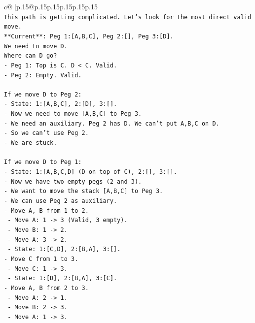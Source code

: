 \documentclass{article}
\begin{document}
{\begin{supertabular}{c@{$\;$}|p{.15\linewidth}@{}p{.15\linewidth}p{.15\linewidth}p{.15\linewidth}p{.15\linewidth}p{.15\linewidth}}
{{{\\ 
\texttt{This path is getting complicated. Let's look for the most direct valid move.} \\
\texttt{**Current**: Peg 1:{[}A,B,C{]}, Peg 2:{[}{]}, Peg 3:{[}D{]}.} \\
\texttt{We need to move D.} \\
\texttt{Where can D go?} \\
\texttt{{-} Peg 1: Top is C. D < C. Valid.} \\
\texttt{{-} Peg 2: Empty. Valid.} \\
\\ 
\texttt{If we move D to Peg 2:} \\
\texttt{{-} State: 1:{[}A,B,C{]}, 2:{[}D{]}, 3:{[}{]}.} \\
\texttt{{-} Now we need to move {[}A,B,C{]} to Peg 3.} \\
\texttt{{-} We need an auxiliary. Peg 2 has D. We can't put A,B,C on D.} \\
\texttt{{-} So we can't use Peg 2.} \\
\texttt{{-} We are stuck.} \\
\\ 
\texttt{If we move D to Peg 1:} \\
\texttt{{-} State: 1:{[}A,B,C,D{]} (D on top of C), 2:{[}{]}, 3:{[}{]}.} \\
\texttt{{-} Now we have two empty pegs (2 and 3).} \\
\texttt{{-} We want to move the stack {[}A,B,C{]} to Peg 3.} \\
\texttt{{-} We can use Peg 2 as auxiliary.} \\
\texttt{{-} Move A, B from 1 to 2.} \\
\texttt{  {-} Move A: 1 {-}> 3 (Valid, 3 empty).} \\
\texttt{  {-} Move B: 1 {-}> 2.} \\
\texttt{  {-} Move A: 3 {-}> 2.} \\
\texttt{  {-} State: 1:{[}C,D{]}, 2:{[}B,A{]}, 3:{[}{]}.} \\
\texttt{{-} Move C from 1 to 3.} \\
\texttt{  {-} Move C: 1 {-}> 3.} \\
\texttt{  {-} State: 1:{[}D{]}, 2:{[}B,A{]}, 3:{[}C{]}.} \\
\texttt{{-} Move A, B from 2 to 3.} \\
\texttt{  {-} Move A: 2 {-}> 1.} \\
\texttt{  {-} Move B: 2 {-}> 3.} \\
\texttt{  {-} Move A: 1 {-}> 3.} \\
}}}
\end{supertabular}}
\end{document}
